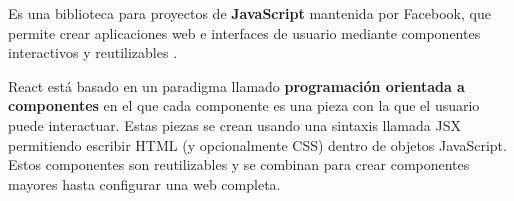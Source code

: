 \documentclass[12pt,twoside,titlepage]{report}
\begin{document}
Es una biblioteca para proyectos de \textbf{JavaScript} mantenida por Facebook, que permite crear aplicaciones web e interfaces de usuario mediante componentes interactivos y reutilizables \cite{react1}.

React está basado en un paradigma llamado \textbf{programación orientada a componentes} en el que cada componente es una pieza con la que el usuario puede interactuar. Estas piezas se crean usando una sintaxis llamada JSX permitiendo escribir HTML (y opcionalmente CSS) dentro de objetos JavaScript. Estos componentes son reutilizables y se combinan para crear componentes mayores hasta configurar una web completa.

\end{document}
